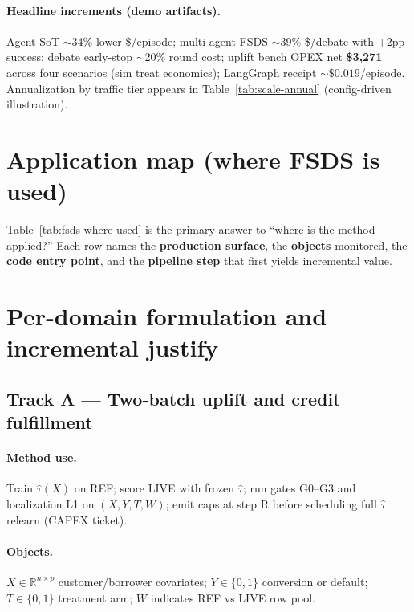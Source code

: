 \documentclass[11pt]{article}
\begin{document}
\paragraph{Headline increments (demo artifacts).}
Agent SoT $\sim$34\% lower \$/episode; multi-agent FSDS $\sim$39\% \$/debate with +2pp success; debate early-stop $\sim$20\% round cost; uplift bench OPEX net \textbf{\$3{,}271} across four scenarios (sim treat economics); LangGraph receipt $\sim\$0.019$/episode.
Annualization by traffic tier appears in Table~\ref{tab:scale-annual} (config-driven illustration).

\section{Application map (where FSDS is used)}

Table~\ref{tab:fsds-where-used} is the primary answer to ``where is the method applied?''
Each row names the \textbf{production surface}, the \textbf{objects} monitored, the \textbf{code entry point}, and the \textbf{pipeline step} that first yields incremental value.



\section{Per-domain formulation and incremental justify}

\subsection{Track A --- Two-batch uplift and credit fulfillment}

\paragraph{Method use.}
Train $\hat\tau(X)$ on REF; score LIVE with frozen $\hat\tau$; run gates G0--G3 and localization L1 on $(X,Y,T,W)$; emit caps at step R before scheduling full $\hat\tau$ relearn (CAPEX ticket).

\paragraph{Objects.}
$X\in\mathbb{R}^{n\times p}$ customer/borrower covariates; $Y\in\{0,1\}$ conversion or default; $T\in\{0,1\}$ treatment arm; $W$ indicates REF vs LIVE row pool.
\end{document}
